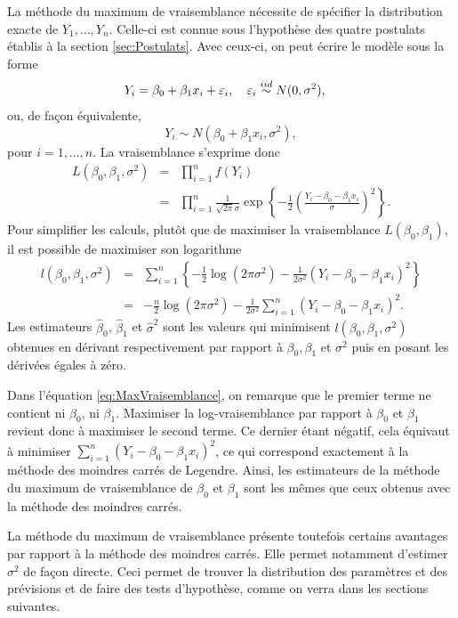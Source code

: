 La méthode du maximum de vraisemblance nécessite de spécifier la distribution exacte de $Y_1,\dots, Y_n$. Celle-ci est connue sous l'hypothèse des quatre postulats établis à la section \ref{sec:Postulats}.
Avec ceux-ci, on peut écrire le modèle sous la forme
\begin{align*}
Y_i &= \beta_0 + \beta_1 x_i + \varepsilon_i, \ \ \  \varepsilon_i \overset{iid}{\sim} N(0,\sigma^2),
 \end{align*}
ou, de façon équivalente,
\begin{equation}
Y_i \sim N(\beta_0 + \beta_1 x_i, \sigma^2),
\end{equation}
pour $i = 1, \dots, n$.
La vraisemblance s'exprime donc
\begin{eqnarray*}
 L (\beta_0, \beta_1, \sigma^2)&=&\prod_{i=1} ^n f(Y_i) \\
 &=& \prod_{i=1} ^n \frac{1}{\sqrt{2\pi}\sigma} \exp\left\{-\frac{1}{2} \left(\frac{Y_i-\beta_0 - \beta_1 x_i}{\sigma}\right)^2\right\}.
\end{eqnarray*}
Pour simplifier les calculs, plutôt que de maximiser la vraisemblance $L (\beta_0, \beta_1)$, il est possible de maximiser son logarithme
 \begin{eqnarray}
 \nonumber l (\beta_0, \beta_1, \sigma^2)&=&\sum_{i=1}^n \left\{-\frac{1}{2}\log(2\pi\sigma^2)-\frac{1}{2\sigma^2}(Y_i - \beta_0 - \beta_1 x_i)^2\right\}\\ \label{eq:MaxVraisemblance}
 &=& -\frac{n}{2} \log (2\pi\sigma^2)-\frac{1}{2 \sigma^2}\sum_{i=1}^n (Y_i - \beta_0 - \beta_1 x_i)^2.
\end{eqnarray}
Les estimateurs $\widehat\beta_0$, $\widehat\beta_1$ et $\widehat\sigma^2$ sont les valeurs qui minimisent $l (\beta_0, \beta_1,\sigma^2)$ obtenues en dérivant respectivement par rapport à $\beta_0,\beta_1$ et $\sigma^2$ puis en posant les dérivées égales à zéro.

Dans l'équation \eqref{eq:MaxVraisemblance}, on remarque que le premier terme ne contient ni $\beta_0$, ni $\beta_1$. Maximiser la log-vraisemblance par rapport à $\beta_0$ et $\beta_1$ revient donc à maximiser le second terme. Ce dernier étant négatif, cela équivaut à minimiser $\sum_{i=1}^n (Y_i - \beta_0 - \beta_1 x_i)^2$, ce qui correspond exactement à la méthode des moindres carrés de Legendre.  Ainsi, les estimateurs de la méthode du maximum de vraisemblance de $\beta_0$ et $\beta_1$ sont les mêmes que ceux obtenus avec la méthode des moindres carrés.

La méthode du maximum de vraisemblance présente toutefois certains avantages par rapport à la méthode des moindres carrés. Elle permet notamment d'estimer $\sigma^2$ de façon directe. Ceci permet de trouver la distribution des paramètres et des prévisions et de faire des tests d'hypothèse, comme on verra dans les sections suivantes.

